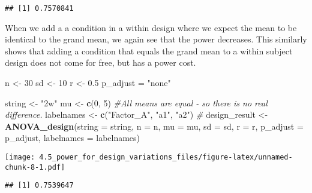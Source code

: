 \documentclass[]{article}
\newenvironment{Shaded}{\begin{snugshade}}{\end{snugshade}}
\newcommand{\KeywordTok}[1]{\textcolor[rgb]{0.13,0.29,0.53}{\textbf{#1}}}
\newcommand{\DataTypeTok}[1]{\textcolor[rgb]{0.13,0.29,0.53}{#1}}
\newcommand{\DecValTok}[1]{\textcolor[rgb]{0.00,0.00,0.81}{#1}}
\newcommand{\FloatTok}[1]{\textcolor[rgb]{0.00,0.00,0.81}{#1}}
\newcommand{\StringTok}[1]{\textcolor[rgb]{0.31,0.60,0.02}{#1}}
\newcommand{\CommentTok}[1]{\textcolor[rgb]{0.56,0.35,0.01}{\textit{#1}}}
\newcommand{\OperatorTok}[1]{\textcolor[rgb]{0.81,0.36,0.00}{\textbf{#1}}}
\newcommand{\NormalTok}[1]{#1}
\begin{document}
\begin{verbatim}
## [1] 0.7570841
\end{verbatim}

When we add a a condition in a within design where we expect the mean to
be identical to the grand mean, we again see that the power decreases.
This similarly shows that adding a condition that equals the grand mean
to a within subject design does not come for free, but has a power cost.

\begin{Shaded}
\begin{Highlighting}[]
\NormalTok{n <-}\StringTok{ }\DecValTok{30}
\NormalTok{sd <-}\StringTok{ }\DecValTok{10}
\NormalTok{r <-}\StringTok{ }\FloatTok{0.5}
\NormalTok{p_adjust =}\StringTok{ "none"}


\NormalTok{string <-}\StringTok{ "2w"}
\NormalTok{mu <-}\StringTok{ }\KeywordTok{c}\NormalTok{(}\DecValTok{0}\NormalTok{, }\DecValTok{5}\NormalTok{) }\CommentTok{#All means are equal - so there is no real difference.}
\NormalTok{labelnames <-}\StringTok{ }\KeywordTok{c}\NormalTok{(}\StringTok{"Factor_A"}\NormalTok{, }\StringTok{"a1"}\NormalTok{, }\StringTok{"a2"}\NormalTok{) }\CommentTok{#}
\NormalTok{design_result <-}\StringTok{ }\KeywordTok{ANOVA_design}\NormalTok{(}\DataTypeTok{string =}\NormalTok{ string, }\DataTypeTok{n =}\NormalTok{ n, }\DataTypeTok{mu =}\NormalTok{ mu, }\DataTypeTok{sd =}\NormalTok{ sd, }\DataTypeTok{r =}\NormalTok{ r, }
                   \DataTypeTok{p_adjust =}\NormalTok{ p_adjust, }\DataTypeTok{labelnames =}\NormalTok{ labelnames)}
\end{Highlighting}
\end{Shaded}

\texttt{[image: 4.5\_power\_for\_design\_variations\_files/figure-latex/unnamed-chunk-8-1.pdf]}

\begin{Shaded}
\end{Shaded}

\begin{verbatim}
## [1] 0.7539647
\end{verbatim}

\begin{Shaded}
\end{Shaded}
\end{document}
